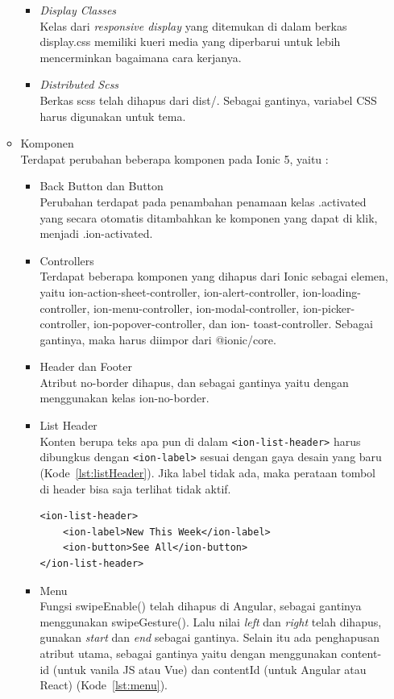 \begin{enumerate}
\begin{itemize}
\begin{itemize}
			\item {\it Display Classes} \\ 
			Kelas dari {\it responsive display} yang ditemukan di dalam berkas display.css memiliki kueri media yang diperbarui untuk lebih mencerminkan bagaimana cara kerjanya.

			\item {\it Distributed Scss} \\
			Berkas scss telah dihapus dari dist/. Sebagai gantinya, variabel CSS harus digunakan untuk tema.

		\end{itemize}

		\item Komponen\\
		Terdapat perubahan beberapa komponen pada Ionic 5, yaitu :
		\begin{itemize}
			\item Back Button dan Button  \\
			Perubahan terdapat pada penambahan penamaan kelas .activated yang secara otomatis ditambahkan ke komponen yang dapat di klik, menjadi .ion-activated.
			
			\item Controllers\\
			Terdapat beberapa komponen yang dihapus dari Ionic sebagai elemen, yaitu ion-action-sheet-controller, ion-alert-controller, ion-loading-controller, ion-menu-controller, ion-modal-controller, ion-picker-controller, ion-popover-controller, dan ion- toast-controller. Sebagai gantinya, maka harus diimpor dari @ionic/core. 
			\item Header dan Footer\\
			Atribut no-border dihapus, dan sebagai gantinya yaitu dengan menggunakan kelas ion-no-border.
			
			\item List Header\\
			Konten berupa teks apa pun di dalam \texttt{<ion-list-header>} harus dibungkus dengan \texttt{<ion-label>} sesuai dengan gaya desain yang baru (Kode~\ref{lst:listHeader}). Jika label tidak ada, maka perataan tombol di header bisa saja terlihat tidak aktif. 
			\newpage
\begin{lstlisting}[label={lst:listHeader}, caption=Kode Program untuk List Header]
<ion-list-header>
	<ion-label>New This Week</ion-label>
	<ion-button>See All</ion-button>
</ion-list-header>
\end{lstlisting}
			\item Menu\\
			Fungsi swipeEnable() telah dihapus di Angular, sebagai gantinya menggunakan swipeGesture(). Lalu nilai {\it left} dan {\it right} telah dihapus, gunakan {\it start} dan {\it end} sebagai gantinya. Selain itu ada penghapusan atribut utama, sebagai gantinya yaitu dengan menggunakan content-id (untuk vanila JS atau Vue) dan contentId (untuk Angular atau React) (Kode~\ref{lst:menu}).			
			

\end{itemize}
\end{itemize}
\end{enumerate}
